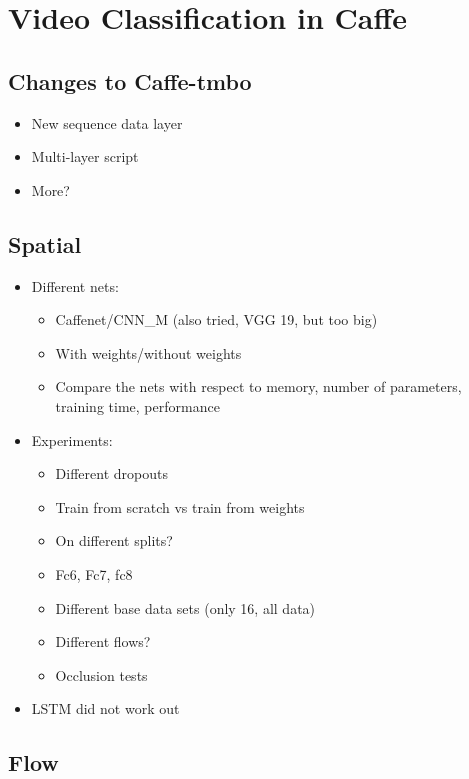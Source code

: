 \section{Video Classification in Caffe}
\label{sec:classification}

\subsection{Changes to Caffe-tmbo}

\begin{itemize}
	\item New sequence data layer
	\item Multi-layer script
	\item More?
\end{itemize}

\subsection{Spatial}

\begin{itemize}
	\item
		Different nets:
		\begin{itemize}
			\item Caffenet/CNN\_M (also tried, VGG 19, but too big)
			\item With weights/without weights
			\item Compare the nets with respect to memory, number of parameters, training time, performance
		\end{itemize}
	\item
		Experiments:
		\begin{itemize}
			\item Different dropouts
			\item Train from scratch vs train from weights
			\item On different splits?
			\item Fc6, Fc7, fc8
			\item Different base data sets (only 16, all data)
			\item Different flows?
			\item Occlusion tests
		\end{itemize}
	\item
		LSTM did not work out
\end{itemize}


\subsection{Flow}


